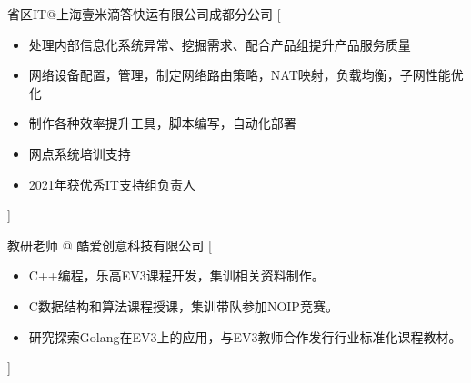 \documentclass[zh]{resume}
\begin{document}
\begin{experiences}
    {省区IT@上海壹米滴答快运有限公司成都分公司}%
    [\begin{itemize}
      \item 处理内部信息化系统异常、挖掘需求、配合产品组提升产品服务质量
      \item 网络设备配置，管理，制定网络路由策略，NAT映射，负载均衡，子网性能优化
      \item 制作各种效率提升工具，脚本编写，自动化部署
      \item 网点系统培训支持
      \item 2021年获优秀IT支持组负责人
    \end{itemize}]

  \separator{0.5ex}
    {教研老师 @ 酷爱创意科技有限公司}%
    [\begin{itemize}
      \item C++编程，乐高EV3课程开发，集训相关资料制作。
      \item C数据结构和算法课程授课，集训带队参加NOIP竞赛。
      \item 研究探索Golang在EV3上的应用，与EV3教师合作发行行业标准化课程教材。
    \end{itemize}]
\end{experiences}
\end{document}
